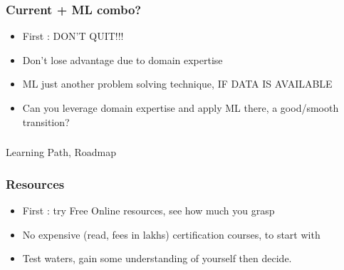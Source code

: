 \begin{frame}[fragile]\frametitle{Current + ML combo?}

      \begin{itemize}
			\item First : DON'T QUIT!!!
			\item Don't lose advantage due to domain expertise
			\item ML just another problem solving technique, IF DATA IS AVAILABLE
			\item Can you leverage domain expertise and apply ML there, a good/smooth transition?
			\end{itemize}
			
\end{frame}

\begin{frame}[fragile]\frametitle{}
	
	\begin{center}
	{\Large Learning Path, Roadmap}  
	\end{center}

\end{frame}


\begin{frame}[fragile]\frametitle{Resources}

      \begin{itemize}
			\item First : try Free Online resources, see how much you grasp
			\item No expensive (read, fees in lakhs) certification courses, to start with
			\item Test waters, gain some understanding of yourself then decide.
			\end{itemize}
			
\end{frame}

